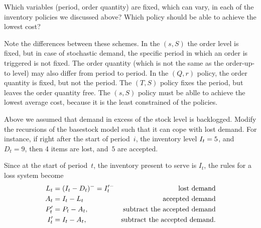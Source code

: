 \documentclass[queueing-book.tex]{subfiles}
\begin{document}
\begin{exercise}
  Which variables (period, order quantity) are fixed, which can  vary, in each of the inventory policies  we discussed above? Which policy should be able to achieve the lowest cost?
  \begin{solution}
  Note the differences between these schemes.
In the $(s,S)$ the order level is fixed, but in case of stochastic demand, the specific period in which an order is triggered is not fixed.
The order quantity (which is not the same as the order-up-to level) may also differ from period to period.
In the $(Q,r)$ policy, the order quantity is fixed, but not the period.
The $(T,S)$ policy fixes the period, but leaves the order quantity free.
The $(s,S)$ policy must be ablle to achieve the lowest average cost, because it is the least constrained of the policies.
  \end{solution}
\end{exercise}



\begin{exercise}
Above we assumed that demand in excess of the  stock level is backlogged.
Modify the recursions of the basestock model such that it can cope with lost demand.
For instance, if right after the start of period~$i$, the inventory level $I_{t}= 5$, and $D_t=9$, then 4 items are lost, and~$5$ are accepted.
\begin{solution}
Since at the start of period~$t$, the inventory present to serve is $I_{t}$, the rules for a loss system become
\begin{align*}
L_t &= (I_t-D_t)^- = I_t'^- & \text{lost demand}\\
A_t &= I_{t} - L_t & \text{accepted demand}\\
P_t' &= P_{t} - A_t, &\text{subtract the accepted demand}\\
I_t' &= I_{t} - A_t, &\text{subtract the accepted demand}.
\end{align*}
\end{solution}
\end{exercise}
\end{document}
